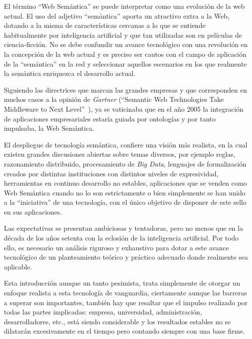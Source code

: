 El término ``Web Semántica'' se puede interpretar como una evolución de la web
actual. El uso del adjetivo ``semántica'' aporta un atractivo extra a la Web, dotando a la misma de características cercanas a lo que se entiende 
habitualmente por inteligencia artificial y que tan utilizadas son en películas de ciencia-ficción.
No se debe confundir un avance tecnológico con una revolución en la concepción
de la web actual y es preciso ser cautos con el campo de aplicación de la
``semántica'' en la red y seleccionar aquellos escenarios en los que realmente
la semántica enriquezca el desarrollo actual.

Siguiendo las directrices que marcan las grandes empresas y que
corresponden en muchos casos a la opinión de \textit{Gartner} (``Semantic Web Technologies
Take Middleware to Next Level''~\cite{gartner}), ya se vaticinaba que en el año 2005 la integración de 
aplicaciones empresariales estaría guiada por ontologías y por tanto impulsaba, la Web Semántica.

El despliegue de tecnología semántica, confiere una visión más realista, en
la cual existen grandes discusiones abiertas sobre temas diversos, por ejemplo
reglas, razonamiento distribuido, procesamiento de \textit{\gls{Big Data}}, lenguajes de formalización creados por distintas instituciones 
con distintos niveles de expresividad, herramientas en continuo desarrollo no
estables, aplicaciones que se venden como Web Semántica cuando no lo son
estrictamente o bien simplemente se han unido a la ``iniciativa'' de una tecnología, con el único objetivo de disponer 
de este sello en sus aplicaciones. 

Las expectativas se presentan ambiciosas y tentadoras, pero no menos que en la década de los años setenta con la eclosión 
de la inteligencia artificial. Por todo ello, es necesario un análisis riguroso y exhaustivo para dotar a este avance
tecnológico de un planteamiento teórico y práctico adecuado donde realmente sea aplicable.  

Esta introducción aunque un tanto pesimista, trata simplemente de otorgar un enfoque
realista a esta tecnología de vanguardia, ciertamente aunque las barreras a
superar son importantes, también hay que resaltar que el impulso realizado por
todas las partes implicadas: empresa, universidad, administración, desarrolladores,
etc., está siendo considerable y los resultados estables no se dilatarán excesivamente en el tiempo pero contando 
siempre con una base firme. 